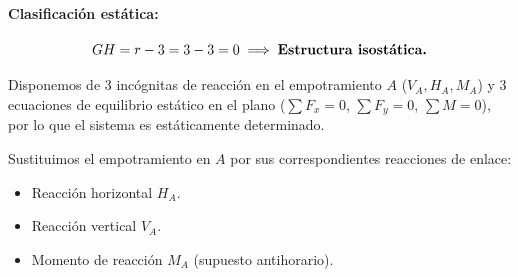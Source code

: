 \paragraph{Clasificación estática:}

\begin{equation}

    GH = r - 3 = 3 - 3 = 0 \implies \text{\textbf{Estructura isostática.}}

\end{equation}

Disponemos de 3 incógnitas de reacción en el empotramiento $A$ ($V_A, H_A, M_A$) y 3 ecuaciones de equilibrio estático en el plano ($\sum F_x = 0$, $\sum F_y = 0$, $\sum M = 0$), por lo que el sistema es estáticamente determinado.






Sustituimos el empotramiento en $A$ por sus correspondientes reacciones de enlace:

\begin{itemize}

    \item Reacción horizontal $H_A$.

    \item Reacción vertical $V_A$.

    \item Momento de reacción $M_A$ (supuesto antihorario).

\end{itemize}



